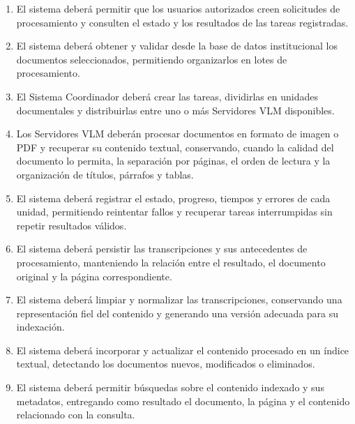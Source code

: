\begin{enumerate}

    \item[\textbf{RF-01}] El sistema deberá permitir que los usuarios autorizados
    creen solicitudes de procesamiento y consulten el estado y los resultados de
    las tareas registradas.

    \item[\textbf{RF-02}] El sistema deberá obtener y validar desde la base de datos
    institucional los documentos seleccionados, permitiendo organizarlos en lotes
    de procesamiento.

    \item[\textbf{RF-03}] El Sistema Coordinador deberá crear las tareas,
    dividirlas en unidades documentales y distribuirlas entre uno o más
    Servidores VLM disponibles.

    \item[\textbf{RF-04}] Los Servidores VLM deberán procesar documentos en formato
    de imagen o PDF y recuperar su contenido textual, conservando, cuando la
    calidad del documento lo permita, la separación por páginas, el orden de
    lectura y la organización de títulos, párrafos y tablas.

    \item[\textbf{RF-05}] El sistema deberá registrar el estado, progreso, tiempos
    y errores de cada unidad, permitiendo reintentar fallos y recuperar tareas
    interrumpidas sin repetir resultados válidos.

    \item[\textbf{RF-06}] El sistema deberá persistir las transcripciones y sus
    antecedentes de procesamiento, manteniendo la relación entre el resultado, el
    documento original y la página correspondiente.

    \item[\textbf{RF-07}] El sistema deberá limpiar y normalizar las transcripciones,
    conservando una representación fiel del contenido y generando una versión
    adecuada para su indexación.

    \item[\textbf{RF-08}] El sistema deberá incorporar y actualizar el contenido
    procesado en un índice textual, detectando los documentos nuevos, modificados
    o eliminados.

    \item[\textbf{RF-09}] El sistema deberá permitir búsquedas sobre el contenido
    indexado y sus metadatos, entregando como resultado el documento, la página y
    el contenido relacionado con la consulta.

\end{enumerate}



